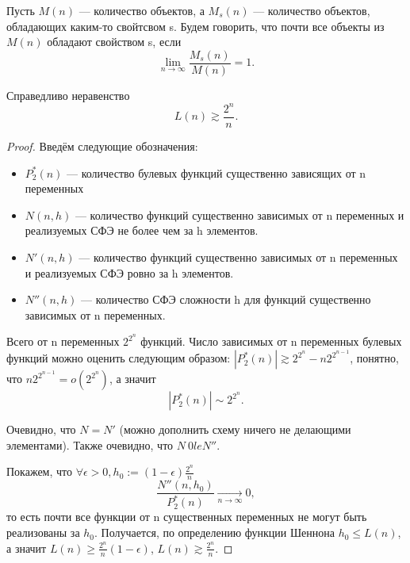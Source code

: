 \begin{definition}
	Пусть $M(n)$ --- количество объектов, а $M_s(n)$ --- количество
	объектов, обладающих каким-то свойтсвом s. Будем говорить, что почти все
	объекты из $M(n)$ обладают свойством s, если \[
		\lim_{n \to \infty} \frac{M_s(n)}{M(n)} = 1
	.\] 
\end{definition}

\begin{theorem}
	Справедливо неравенство \[
		L(n) \gtrsim \frac{2^n}{n}
	.\] 
\end{theorem}
\begin{proof}
Введём следующие обозначения:
\begin{itemize}
	\item $P_2^*(n)$ --- количество булевых функций существенно зависящих от n
		переменных
	\item $N(n, h)$ --- количество функций существенно зависимых от n
		переменных и реализуемых СФЭ не более чем за h элементов.
	\item $N'(n, h)$ --- количество функций существенно зависимых от n
		переменных и реализуемых СФЭ ровно за h элементов.
	\item $N''(n, h)$ --- количество СФЭ сложности h для функций существенно
		зависимых от n переменных.
\end{itemize}
Всего от n переменных $2^{2^n}$ функций. Число зависимых от n переменных булевых
функций можно оценить следующим образом: $|P_2^*(n)| \gtrsim 2^{2^n} - n
2^{2^{n-1}}$, понятно, что $n 2^{2^{n-1}} = o(2^{2^n})$, а значит \[|P_2^*(n)|
\sim 2^{2^n}.\] 

Очевидно, что $N = N'$ (можно дополнить схему ничего не делающими элементами).
Также очевидно, что $N \ 0le N''$. 

Покажем, что  $\forall \epsilon >0, h_0:=\left( 1-\epsilon \right) \frac{2^n}{n}$  \[
	\frac{N''(n,h_0)}{P_2^*(n)} \to\limits_{n \to \infty} 0
,\] то есть почти все функции от n существенных переменных не могут быть
реализованы за $h_0$. Получается, по определению функции Шеннона $h_0 \le L(n)$,
а значит $L(n) \ge \frac{2^n}{n}\left( 1-\epsilon \right) $, $L(n)\gtrsim
\frac{2^n}{n}$.


\end{proof}
